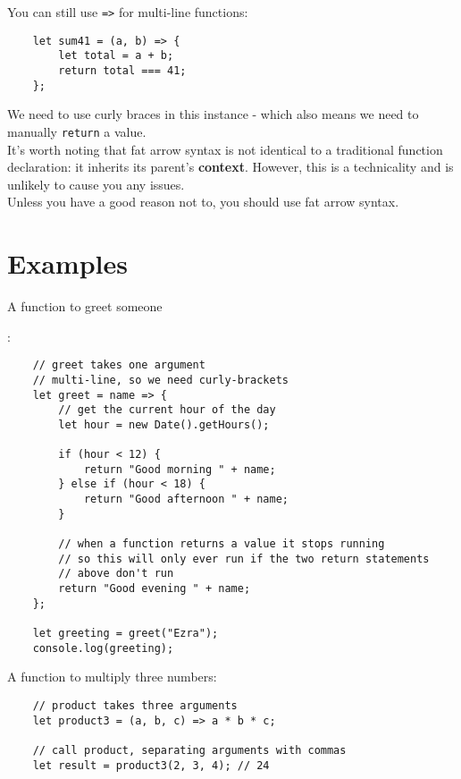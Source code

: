 You can still use \texttt{=>} for multi-line functions:

\begin{verbatim}
    let sum41 = (a, b) => {
        let total = a + b;
        return total === 41;
    };
\end{verbatim}

We need to use curly braces in this instance - which also means we need to manually \texttt{return} a value.
\\

It's worth noting that fat arrow syntax is not identical to a traditional function declaration: it inherits its parent's \textbf{context}. However, this is a technicality and is unlikely to cause you any issues.
\\

Unless you have a good reason not to, you should use fat arrow syntax.

\pagebreak

\section{Examples}

\hypertarget{greet}{A function to greet someone}:

\begin{verbatim}
    // greet takes one argument
    // multi-line, so we need curly-brackets
    let greet = name => {
        // get the current hour of the day
        let hour = new Date().getHours();

        if (hour < 12) {
            return "Good morning " + name;
        } else if (hour < 18) {
            return "Good afternoon " + name;
        }

        // when a function returns a value it stops running
        // so this will only ever run if the two return statements
        // above don't run
        return "Good evening " + name;
    };

    let greeting = greet("Ezra");
    console.log(greeting);
\end{verbatim}


A function to multiply three numbers:

\begin{verbatim}
    // product takes three arguments
    let product3 = (a, b, c) => a * b * c;

    // call product, separating arguments with commas
    let result = product3(2, 3, 4); // 24
\end{verbatim}

